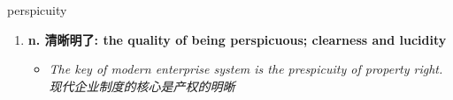 
\begin{frame}
{\huge perspicuity}
\begin{center}
\begin{enumerate}\Large
  \item \textbf{n. 清晰明了: the quality of being perspicuous; clearness and lucidity}
  \begin{itemize}
    \item \em{\Large{The key of modern enterprise system is the prespicuity of property right. 现代企业制度的核心是产权的明晰}}
  \end{itemize}
\end{enumerate}
\end{center}
\end{frame}
